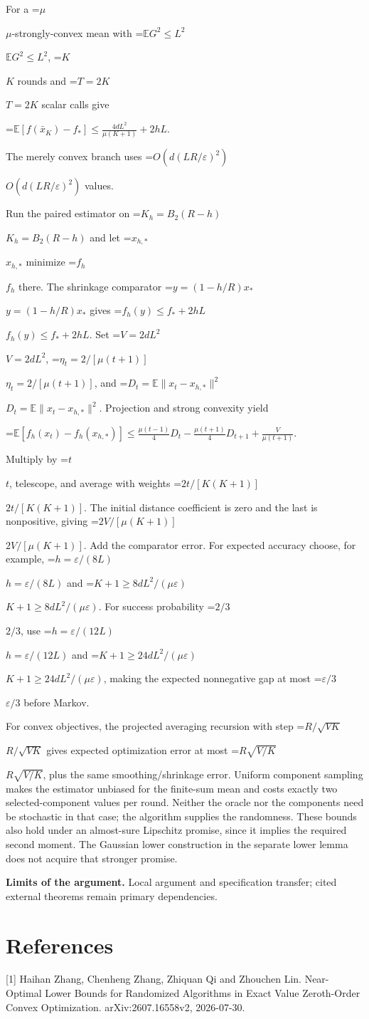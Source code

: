 \documentclass[10pt,a4paper]{article}
\newcommand{\AtlasMath}[1]{\par\begingroup\centering\setbox0=\hbox{$\displaystyle #1$}\ifdim\wd0>1.4\linewidth\typeout{ATLAS WIDE FORMULA: \the\wd0}\fi\ifdim\wd0>\linewidth\resizebox{\linewidth}{!}{\box0}\else\box0\fi\par\endgroup}
\newcommand{\AtlasInlineMath}[1]{\begingroup\setbox0=\hbox{$#1$}\ifdim\wd0>.4\linewidth\endgroup\AtlasMath{#1}\else\endgroup$#1$\fi}
\begin{document}
For a \AtlasInlineMath{\mu}-strongly-convex mean with \AtlasInlineMath{\mathbb E G^2\le L^2}, \AtlasInlineMath{K} rounds and \AtlasInlineMath{T=2K} scalar calls give

\AtlasMath{\mathbb E[f(\bar x_K)-f_*]\le\frac{4dL^2}{\mu(K+1)}+2hL.}

The merely convex branch uses \AtlasInlineMath{O(d(LR/\varepsilon)^2)} values.

Run the paired estimator on \AtlasInlineMath{K_h=B_2(R-h)} and let \AtlasInlineMath{x_{h,*}} minimize \AtlasInlineMath{f_h} there. The shrinkage comparator \AtlasInlineMath{y=(1-h/R)x_*} gives \AtlasInlineMath{f_h(y)\le f_*+2hL}. Set \AtlasInlineMath{V=2dL^2}, \AtlasInlineMath{\eta_t=2/[\mu(t+1)]}, and \AtlasInlineMath{D_t=\mathbb E\|x_t-x_{h,*}\|^2}. Projection and strong convexity yield

\AtlasMath{\mathbb E[f_h(x_t)-f_h(x_{h,*})]\le\frac{\mu(t-1)}4D_t-\frac{\mu(t+1)}4D_{t+1}+\frac{V}{\mu(t+1)}.}

Multiply by \AtlasInlineMath{t}, telescope, and average with weights \AtlasInlineMath{2t/[K(K+1)]}. The initial distance coefficient is zero and the last is nonpositive, giving \AtlasInlineMath{2V/[\mu(K+1)]}. Add the comparator error. For expected accuracy choose, for example, \AtlasInlineMath{h=\varepsilon/(8L)} and \AtlasInlineMath{K+1\ge8dL^2/(\mu\varepsilon)}. For success probability \AtlasInlineMath{2/3}, use \AtlasInlineMath{h=\varepsilon/(12L)} and \AtlasInlineMath{K+1\ge24dL^2/(\mu\varepsilon)}, making the expected nonnegative gap at most \AtlasInlineMath{\varepsilon/3} before Markov.

For convex objectives, the projected averaging recursion with step \AtlasInlineMath{R/\sqrt{VK}} gives expected optimization error at most \AtlasInlineMath{R\sqrt{V/K}}, plus the same smoothing/shrinkage error. Uniform component sampling makes the estimator unbiased for the finite-sum mean and costs exactly two selected-component values per round. Neither the oracle nor the components need be stochastic in that case; the algorithm supplies the randomness. These bounds also hold under an almost-sure Lipschitz promise, since it implies the required second moment. The Gaussian lower construction in the separate lower lemma does not acquire that stronger promise.

\textbf{Limits of the argument.} Local argument and specification transfer; cited external theorems remain primary dependencies.

\section{References}
[1] Haihan Zhang, Chenheng Zhang, Zhiquan Qi and Zhouchen Lin. Near-Optimal Lower Bounds for Randomized Algorithms in Exact Value Zeroth-Order Convex Optimization. arXiv:2607.16558v2, 2026-07-30.
\end{document}
